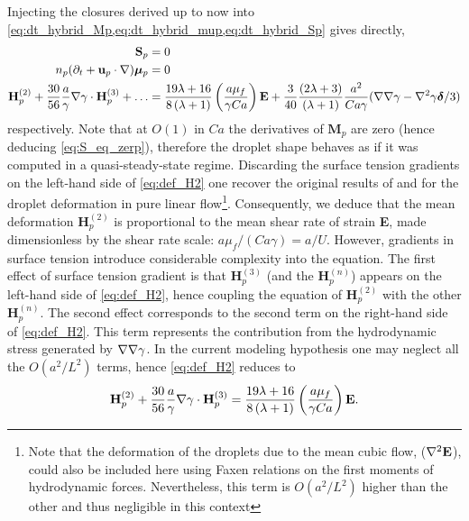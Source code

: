 Injecting the closures derived up to now into \ref{eq:dt_hybrid_Mp,eq:dt_hybrid_mup,eq:dt_hybrid_Sp} gives directly,
\begin{align}    
\textbf{S}_p &= 0 \label{eq:S_eq_zerp}\\
    n_p (\pddt + \textbf{u}_p \cdot \grad)\bm\mu_p &= 0\\
    \textbf{H}_p^{(2)}
    +
    \frac{30}{56}\frac{a}{\gamma}\grad\gamma\cdot \textbf{H}^{(3)}_p
    + \ldots
    &=
    \frac{19 \lambda + 16}{8 \left(\lambda + 1\right)}
    \left(\frac{a \mu_f}{\gamma Ca}\right)
    \textbf{E}
    + 
    \frac{3}{40}\frac{(2\lambda +3)}{(\lambda+1)} 
    \frac{a^2}{Ca\gamma} 
    (\grad\grad\gamma-\grad^2\gamma\bm\delta/3)
    \label{eq:def_H2}
\end{align}
respectively. 
Note that at $O(1)$ in $Ca$ the derivatives of $\textbf{M}_p$ are zero (hence deducing \ref{eq:S_eq_zerp}), therefore the droplet shape behaves as if it was computed in a quasi-steady-state regime.
Discarding the surface tension gradients on the left-hand side of \ref{eq:def_H2} one recover the original results of \citet{taylor1932viscosity,rallison1984deformation} and \citet{nadim1996concise} for the droplet deformation in pure linear flow\footnote{Note that the deformation of the droplets due to the mean cubic flow, ($\mathbf{\nabla}^2\textbf{E}$), could also be included here using Faxen relations on the first moments of hydrodynamic forces.
Nevertheless, this term is $O(a^2/L^2)$ higher than the other and thus negligible in this context }.  
Consequently, we deduce that the mean deformation $\textbf{H}_p^{(2)}$ is proportional to the mean shear rate of strain \textbf{E}, made dimensionless by the shear rate scale: $a \mu_f /(Ca \gamma)= a/U$. 
However, gradients in surface tension introduce considerable complexity into the equation.
The first effect of surface tension gradient is that $\textbf{H}_p^{(3)}$ (and the $\textbf{H}^{(n)}_p$) appears on the left-hand side of \ref{eq:def_H2}, hence coupling the equation of $\textbf{H}_p^{(2)}$ with the other $\textbf{H}_p^{(n)}$. 
The second effect corresponds to the second term on the right-hand side of \ref{eq:def_H2}. 
This term represents the contribution from the hydrodynamic stress generated by $\mathbf{\nabla}\mathbf{\nabla}\gamma$. 
In the current modeling hypothesis one may neglect all the $O(a^2 / L^2)$  terms, hence \ref{eq:def_H2} reduces to
\begin{align}    
        \textbf{H}_p^{(2)}
        +
        \frac{30}{56}\frac{a}{\gamma}\grad\gamma\cdot \textbf{H}^{(3)}_p
        =
        \frac{19 \lambda + 16}{8 \left(\lambda + 1\right)}
        \left(\frac{a \mu_f}{\gamma Ca}\right)
        \textbf{E}. 
        \label{eq:H2_simplified}
\end{align}


